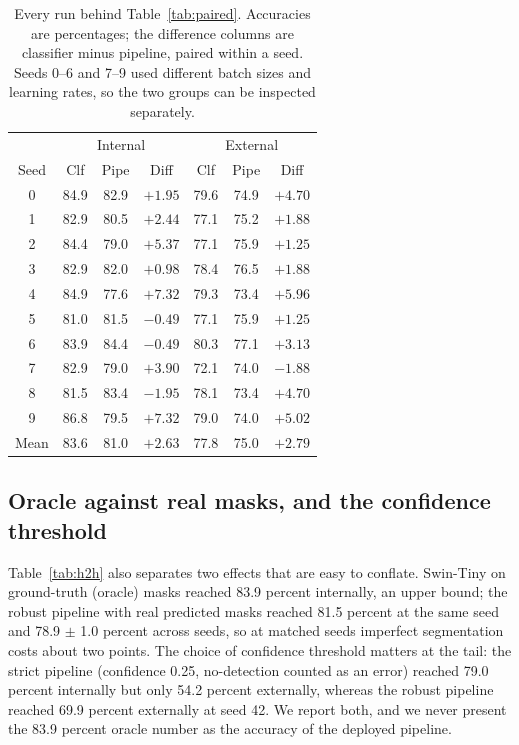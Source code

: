 \documentclass{melba}
\begin{document}
\begin{table}[t]
\centering
\caption{Every run behind Table~\ref{tab:paired}. Accuracies are percentages; the difference columns are classifier minus pipeline, paired within a seed. Seeds 0--6 and 7--9 used different batch sizes and learning rates, so the two groups can be inspected separately.}
\footnotesize
\begin{tabular}{|c|c c c|c c c|}
\hline
 & \multicolumn{3}{c|}{Internal} & \multicolumn{3}{c|}{External} \\
Seed & Clf & Pipe & Diff & Clf & Pipe & Diff \\
\hline
0 & 84.9 & 82.9 & $+1.95$ & 79.6 & 74.9 & $+4.70$ \\
1 & 82.9 & 80.5 & $+2.44$ & 77.1 & 75.2 & $+1.88$ \\
2 & 84.4 & 79.0 & $+5.37$ & 77.1 & 75.9 & $+1.25$ \\
3 & 82.9 & 82.0 & $+0.98$ & 78.4 & 76.5 & $+1.88$ \\
4 & 84.9 & 77.6 & $+7.32$ & 79.3 & 73.4 & $+5.96$ \\
5 & 81.0 & 81.5 & $-0.49$ & 77.1 & 75.9 & $+1.25$ \\
6 & 83.9 & 84.4 & $-0.49$ & 80.3 & 77.1 & $+3.13$ \\
\hline
7 & 82.9 & 79.0 & $+3.90$ & 72.1 & 74.0 & $-1.88$ \\
8 & 81.5 & 83.4 & $-1.95$ & 78.1 & 73.4 & $+4.70$ \\
9 & 86.8 & 79.5 & $+7.32$ & 79.0 & 74.0 & $+5.02$ \\
\hline
Mean & 83.6 & 81.0 & $+2.63$ & 77.8 & 75.0 & $+2.79$ \\
\hline
\end{tabular}
\label{tab:perseed}
\end{table}

\subsection{Oracle against real masks, and the confidence threshold}
\label{Res:oracle}
Table~\ref{tab:h2h} also separates two effects that are easy to conflate. Swin-Tiny on ground-truth (oracle) masks reached 83.9 percent internally, an upper bound; the robust pipeline with real predicted masks reached 81.5 percent at the same seed and 78.9 $\pm$ 1.0 percent across seeds, so at matched seeds imperfect segmentation costs about two points. The choice of confidence threshold matters at the tail: the strict pipeline (confidence 0.25, no-detection counted as an error) reached 79.0 percent internally but only 54.2 percent externally, whereas the robust pipeline reached 69.9 percent externally at seed 42. We report both, and we never present the 83.9 percent oracle number as the accuracy of the deployed pipeline.
\end{document}
